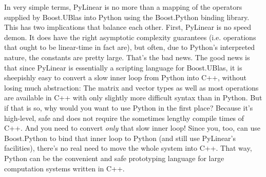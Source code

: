 In very simple terms, PyLinear is no more than a mapping of the
operators supplied by Boost.UBlas into Python using the Boost.Python
binding library.  This has two implications that balance each
other. First, PyLinear is no speed demon. It does have the right
asymptotic complexity guarantees (i.e. operations that ought to be
linear-time in fact are), but often, due to Python's interpreted
nature, the constants are pretty large. That's the bad news. The good
news is that since PyLinear is essentially a scripting language for
Boost.UBlas, it is sheepishly easy to convert a slow inner loop from
Python into C++, without losing much abstraction: The matrix and
vector types as well as most operations are available in C++ with only
slightly more difficult syntax than in Python. But if that is so, why
would you want to use Python in the first place? Because it's
high-level, safe and does not require the sometimes lengthy compile
times of C++.  And you need to convert \emph{only} that slow inner
loop!  Since you, too, can use Boost.Python to bind that inner loop to
Python (and still use PyLinear's facilities), there's no real need to
move the whole system into C++. That way, Python can be the convenient
and safe prototyping language for large computation systems written in
C++.
